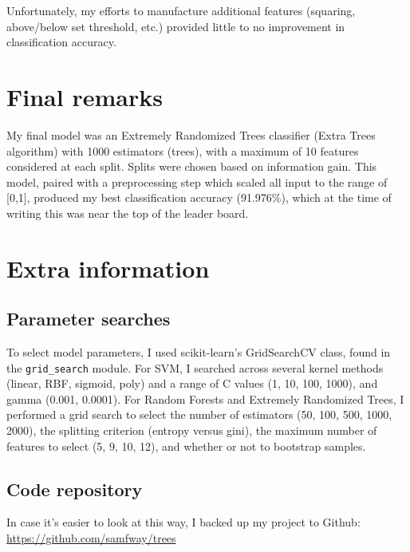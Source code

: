 \documentclass[letter,12pt]{report}
\begin{document}
Unfortunately, my efforts to manufacture additional features (squaring, above/below set threshold, etc.) provided little to no improvement in classification accuracy. 

\section*{Final remarks}

My final model was an Extremely Randomized Trees classifier (Extra Trees algorithm) with 1000 estimators (trees), with a maximum of 10 features considered at each split.  Splits were chosen based on information gain.  This model, paired with a preprocessing step which scaled all input to the range of [0,1], produced my best classification accuracy (91.976\%), which at the time of writing this was near the top of the leader board.   

\section*{Extra information}
\subsection*{Parameter searches}

To select model parameters, I used scikit-learn's GridSearchCV class, found in the \verb!grid_search! module.  For SVM, I searched across several kernel methods (linear, RBF, sigmoid, poly) and a range of C values (1, 10, 100, 1000), and gamma (0.001, 0.0001).  For Random Forests and Extremely Randomized Trees, I performed a grid search to select the number of estimators (50, 100, 500, 1000, 2000), the splitting criterion (entropy versus gini), the maximum number of features to select (5, 9, 10, 12), and whether or not to bootstrap samples.  

\subsection*{Code repository}

In case it's easier to look at this way, I backed up my project to Github:\\ \url{https://github.com/samfway/trees}



\end{document}
